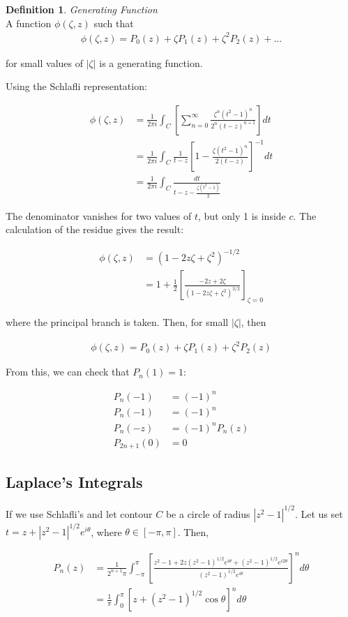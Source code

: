 \documentclass{article}
\theoremstyle{definition}
\newtheorem{definition}{Definition}[section]
\newcommand{\Def}[2]{
\begin{shaded*}
\begin{definition}{\textit{#1}}\\#2\end{definition}
\end{shaded*}
}
\newcommand{\eq}[1]{\begin{align*}
	#1
	\end{align*}}
\begin{document}
\Def{Generating Function}{
A function $\phi(\zeta, z)$ such that 
\eq{\phi(\zeta, z) = P_0(z) + \zeta P_1(z) + \zeta^2 P_2(z) + ...}

for small values of $|\zeta|$ is a generating function.
}
Using the Schlafli representation:

\begin{align*}
\phi(\zeta,z) &= \frac{1}{2 \pi i} \int_C \left[\sum_{n=0}^\infty \frac{\zeta^n(t^2-1)^n}{2^n(t-z)^{n+1}}\right]dt \\ 
&= \frac{1}{2 \pi i} \int_C \frac{1}{t-z}\left[1 -  \frac{\zeta(t^2-1)^n}{2(t-z)}\right]^{-1}dt \\ 
&= \frac{1}{2 \pi i} \int_C \frac{dt}{t-z-\frac{\zeta(t^2-1)}{2}}
\end{align*}


The denominator vanishes for two values of $t$, but only 1 is inside $c$. The calculation of the residue gives the result:

\begin{align*}
\phi(\zeta,z)& = (1-2z \zeta + \zeta^2)^{-1/2} \\ 
&= 1 + \frac{1}{2} \left[\frac{-2z+2\zeta}{(1-2z\zeta + \zeta^2)^{3/2}} \right]_{\zeta=0}
\end{align*}

where the principal branch is taken. Then, for small $|\zeta|$, then 

\begin{align*}
\phi(\zeta,z) = P_0(z) + \zeta P_1(z) + \zeta^2 P_2(z)
\end{align*}

From this, we can check that $P_n(1)=1$:

\begin{align*}
P_n(-1)& = (-1)^n \\ 
P_n(-1) &= (-1)^n \\ 
P_n(-z) &= (-1)^nP_n(z) \\ 
P_{2n+1}(0) &= 0 
\end{align*}

\subsection{Laplace's Integrals}
If we use Schlafli's and let contour $C$ be a circle of radius $|z^2-1|^{1/2}$. Let us set $t=z + |z^2-1|^{1/2} e^{i\theta}$, where $\theta \in [-\pi, \pi]$. Then, 

\begin{align*}
P_n(z) &= \frac{1}{2^{n+1} \pi } \int_{-\pi}^\pi \left[\frac{z^2-1 + 2z(z^2-1)^{1/2} e^{i\theta} + (z^2-1)^{1/2} e^{i2\theta}}{(z^2-1)^{1/2} e^{i\theta}}\right]^n d\theta \\ 
&=\frac{1}{ \pi } \int_{0}^\pi [z +(z^2-1)^{1/2} \cos \theta ]^n d\theta 
\end{align*}
\end{document}
